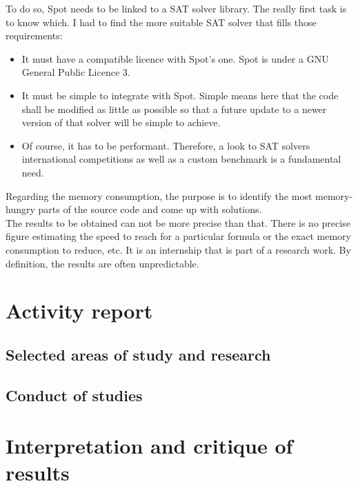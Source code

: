 To do so, Spot needs to be linked to a SAT solver library. The really first task is to know which. I had
to find the more suitable SAT solver that fills those requirements:
\begin{itemize}
 \item It must have a compatible licence with Spot's one. Spot is under a GNU General Public Licence 3.
 \item It must be simple to integrate with Spot. Simple means here that the code shall be modified as little
       as possible so that a future update to a newer version of that solver will be simple to achieve.
 \item Of course, it has to be performant. Therefore, a look to SAT solvers international competitions as
       well as a custom benchmark is a fundamental need.
\end{itemize}

\noindent Regarding the memory consumption, the purpose is to identify the most memory-hungry parts of the
source code and come up with solutions.\\

The results to be obtained can not be more precise than that. There is no precise figure estimating the
speed to reach for a particular formula or the exact memory consumption to reduce, etc. It is an internship
that is part of a research work. By definition, the results are often unpredictable.

\section{Activity report}
\subsection{Selected areas of study and research}
\subsection{Conduct of studies}
\section{Interpretation and critique of results}